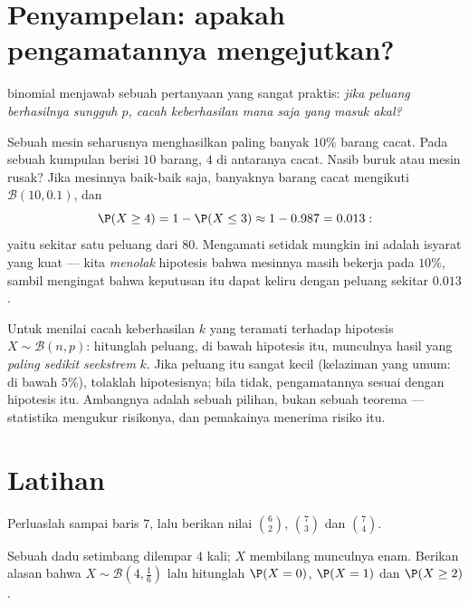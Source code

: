 \section{Penyampelan: apakah pengamatannya mengejutkan?}

 binomial menjawab sebuah pertanyaan yang sangat praktis:
\emph{jika peluang berhasilnya sungguh $p$, cacah keberhasilan mana saja yang
masuk akal?}

\begin{example}\label{ex:g11:binom:decision}
Sebuah mesin seharusnya menghasilkan paling banyak $10\%$ barang cacat. Pada
sebuah kumpulan berisi $10$ barang, $4$ di antaranya cacat. Nasib buruk atau
mesin rusak? Jika mesinnya baik-baik saja, banyaknya barang cacat mengikuti
$\mathcal B(10, 0.1)$, dan
\[
\P(X \geq 4) = 1 - \P(X \leq 3) \approx 1 - 0.987 = 0.013 :
\]
yaitu sekitar satu peluang dari $80$. Mengamati  setidak mungkin ini
adalah isyarat yang kuat --- kita \emph{menolak} hipotesis bahwa mesinnya masih
bekerja pada $10\%$, sambil mengingat bahwa keputusan itu dapat keliru dengan
peluang sekitar $0.013$.
\end{example}

\begin{method}\label{met:g11:binom:decision}
Untuk menilai cacah keberhasilan $k$ yang teramati terhadap hipotesis
$X \sim \mathcal B(n, p)$: hitunglah peluang, di bawah hipotesis itu,
munculnya hasil yang \emph{paling sedikit seekstrem} $k$. Jika peluang itu
sangat kecil (kelaziman yang umum: di bawah $5\%$), tolaklah hipotesisnya;
bila tidak, pengamatannya sesuai dengan hipotesis itu. Ambangnya adalah sebuah
pilihan, bukan sebuah teorema --- statistika mengukur risikonya, dan pemakainya
menerima risiko itu.
\end{method}

\section{Latihan}

\begin{exercise}[$\star$]\label{exo:g11:binom:1}
Perluaslah  sampai baris $7$, lalu berikan nilai
$\binom62$, $\binom{7}{3}$ dan $\binom74$.
\end{exercise}

\begin{exercise}[$\star$]\label{exo:g11:binom:2}
Sebuah dadu setimbang dilempar $4$ kali; $X$ membilang munculnya enam. Berikan
alasan bahwa $X \sim \mathcal B\left(4, \frac16\right)$ lalu hitunglah
$\P(X = 0)$, $\P(X = 1)$ dan $\P(X \geq 2)$.
\end{exercise}


